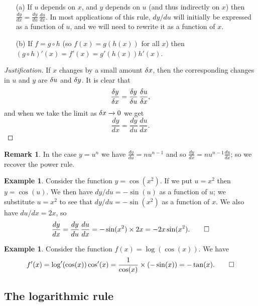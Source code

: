 \documentclass[a4paper]{book}
\theoremstyle{definition}
\newtheorem{remark}[theorem]{Remark}
\newtheorem{example}[theorem]{Example}
\begin{document}
\begin{itemize}
 \item[(a)] If $u$ depends on $x$, and $y$ depends on $u$ (and thus
  indirectly on $x$) then
  $\frac{dy}{dx}=\frac{dy}{du}\,\frac{du}{dx}$.  In most applications
  of this rule, $dy/du$ will initially be expressed as a function of
  $u$, and we will need to rewrite it as a function of $x$.
 \item[(b)] If $f=g\circ h$ (so $f(x)=g(h(x))$ for all $x$) then
  $(g\circ h)'(x)=f'(x)=g'(h(x))h'(x)$.
\end{itemize}
\begin{proof}[Justification]
 If $x$ changes by a small amount $\delta x$, then the corresponding
 changes in $u$ and $y$ are $\delta u$ and $\delta y$.  It is clear that 
 \[ \frac{\delta y}{\delta x} = \frac{\delta y}{\delta u}\, \frac{\delta u}{\delta x},
 \] 
 and when we take the limit as $\delta x\xrightarrow{}0$ we get
 \[ \frac{dy}{dx} = \frac{dy}{du} \, \frac{du}{dx}. \]
\end{proof}
\begin{remark}
 In the case $y=u^n$ we have $\frac{dy}{du}=nu^{n-1}$ and so
 $\frac{dy}{dx}=nu^{n-1}\frac{du}{dx}$; so we recover the power rule.
\end{remark}
\begin{example}
 Consider the function $y=\cos(x^2)$.  If we put $u=x^2$ then
 $y=\cos(u)$.  We then have $dy/du=-\sin(u)$ as a function of $u$; we
 substitute $u=x^2$ to see that $dy/du=-\sin(x^2)$ as a function of
 $x$.  We also have $du/dx=2x$, so
 \[ \frac{dy}{dx} = \frac{dy}{du}\,\frac{du}{dx} =
      -\sin(x^2) \times 2x = -2x\sin(x^2). \qed
 \]
\end{example}
\begin{example}
 Consider the function $f(x)=\log(\cos(x))$.  We have
 \[ f'(x) = \log'(\cos(x))\cos'(x) = \frac{1}{\cos(x)} \times (-\sin(x))
          = -\tan(x). \qed
 \]  
\end{example}

\subsection{The logarithmic rule}
\label{subsec-rule-log}
\end{document}
